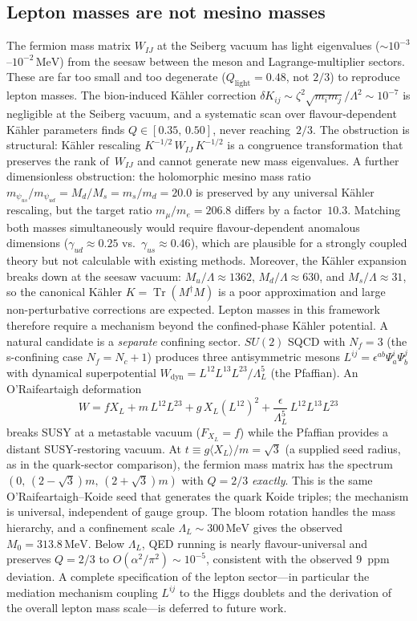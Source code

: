 \documentclass[12pt,a4paper]{article}
\newcommand{\MeV}{\,\text{MeV}}
\begin{document}
\subsection{Lepton masses are not mesino masses}
The fermion mass matrix $W_{IJ}$ at the Seiberg vacuum has
light eigenvalues ($\sim 10^{-3}$--$10^{-2}\MeV$) from the
seesaw between the meson and Lagrange-multiplier sectors.
These are far too small and too degenerate
($Q_{\text{light}} = 0.48$, not $2/3$) to reproduce lepton masses.
The bion-induced K\"ahler correction
$\delta K_{ij} \sim \zeta^2 \sqrt{m_i m_j}/\Lambda^2 \sim 10^{-7}$
is negligible at the Seiberg vacuum, and a systematic scan over
flavour-dependent K\"ahler parameters finds $Q \in [0.35,\,0.50]$,
never reaching~$2/3$.
The obstruction is structural: K\"ahler rescaling
$K^{-1/2}\,W_{IJ}\,K^{-1/2}$ is a congruence transformation
that preserves the rank of~$W_{IJ}$ and cannot generate new
mass eigenvalues.
A further dimensionless obstruction: the holomorphic mesino
mass ratio $m_{\psi_{us}}/m_{\psi_{ud}} = M_d/M_s = m_s/m_d = 20.0$
is preserved by any universal K\"ahler rescaling, but the target
ratio $m_\mu/m_e = 206.8$ differs by a factor~$10.3$.  Matching
both masses simultaneously would require flavour-dependent
anomalous dimensions ($\gamma_{ud} \approx 0.25$ vs.\
$\gamma_{us} \approx 0.46$), which are plausible for a
strongly coupled theory but not calculable with existing methods.
Moreover, the K\"ahler expansion breaks down at the seesaw
vacuum: $M_u/\Lambda \approx 1362$, $M_d/\Lambda \approx 630$,
and $M_s/\Lambda \approx 31$, so the canonical K\"ahler
$K = \operatorname{Tr}(M^\dagger M)$ is a poor approximation
and large non-perturbative corrections are expected.
Lepton masses in this framework therefore require a mechanism
beyond the confined-phase K\"ahler potential.
A natural candidate is a \emph{separate} confining sector.
$SU(2)$ SQCD with $N_f = 3$ (the s-confining case $N_f = N_c + 1$)
produces three antisymmetric mesons $L^{ij} = \epsilon^{ab}\Psi^i_a\Psi^j_b$
with dynamical superpotential
$W_{\text{dyn}} = L^{12}L^{13}L^{23}/\Lambda_L^5$ (the Pfaffian).
An O'Raifeartaigh deformation
\[
  W = f X_L + m\,L^{12}L^{23} + g\,X_L(L^{12})^2
    + \frac{\epsilon}{\Lambda_L^5}\,L^{12}L^{13}L^{23}
\]
breaks SUSY at a metastable vacuum ($F_{X_L} = f$) while the
Pfaffian provides a distant SUSY-restoring vacuum.
At $t \equiv g\langle X_L\rangle/m = \sqrt{3}$
(a supplied seed radius, as in the quark-sector comparison),
the fermion mass matrix has the spectrum
$(0,\,(2-\sqrt{3})m,\,(2+\sqrt{3})m)$
with $Q = 2/3$ \emph{exactly}.
This is the same O'Raifeartaigh--Koide seed that generates the quark
Koide triples; the mechanism is universal, independent of gauge group.
The bloom rotation handles the mass hierarchy, and a
confinement scale $\Lambda_L \sim 300\MeV$ gives the
observed $M_0 = 313.8\MeV$.
Below $\Lambda_L$, QED running is nearly flavour-universal
and preserves $Q = 2/3$ to $O(\alpha^2/\pi^2) \sim 10^{-5}$,
consistent with the observed $9$~ppm deviation.
A complete specification of the lepton sector---in particular
the mediation mechanism coupling $L^{ij}$ to the Higgs doublets
and the derivation of the overall lepton mass scale---is deferred
to future work.
\end{document}
